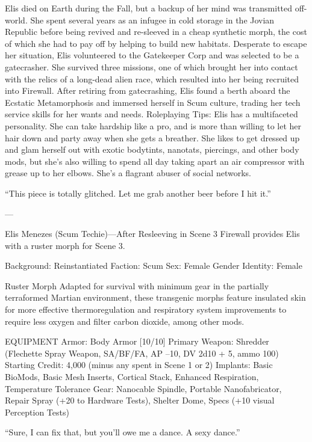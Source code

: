 Elis died on Earth during the Fall, but a backup of her mind was transmitted off-world. She spent several years as an infugee in cold storage in the Jovian Republic before being revived and re-sleeved in a cheap synthetic morph, the cost of which she had to pay off by helping to build new habitats. Desperate to escape her situation, Elis volunteered to the Gatekeeper Corp and was selected to be a gatecrasher. She survived three missions, one of which brought her into contact with the relics of a long-dead alien race, which resulted into her being recruited into Firewall. After retiring from gatecrashing, Elis found a berth aboard the Ecstatic Metamorphosis and immersed herself in Scum culture, trading her tech service skills for her wants and needs.
Roleplaying Tips: Elis has a multifaceted personality. She can take hardship like a pro, and is more than willing to let her hair down and party away when she gets a breather. She likes to get dressed up and glam herself out with exotic bodytints, nanotats, piercings, and other body mods, but she’s also willing to spend all day taking apart an air compressor with grease up to her elbows. She’s a flagrant abuser of social networks. 

“This piece is totally glitched. Let me grab another beer before I hit it.”

---

Elis Menezes (Scum Techie)—After Resleeving in Scene 3
Firewall provides Elis with a ruster morph for Scene 3.

Background: Reinstantiated
Faction: Scum
Sex: Female
Gender Identity: Female

Ruster Morph
Adapted for survival with minimum gear in the partially terraformed Martian environment, these transgenic morphs feature insulated skin for more effective thermoregulation and respiratory system improvements to require less oxygen and filter carbon dioxide, among other mods. 

EQUIPMENT
Armor: Body Armor [10/10]
Primary Weapon: Shredder (Flechette Spray Weapon, SA/BF/FA, AP –10, DV 2d10 + 5, ammo 100)
Starting Credit: 4,000 (minus any spent in Scene 1 or 2) 
Implants: Basic BioMods, Basic Mesh Inserts, Cortical Stack, Enhanced Respiration, Temperature Tolerance
Gear: Nanocable Spindle, Portable Nanofabricator, Repair Spray (+20 to Hardware Tests), Shelter Dome, Specs (+10 visual Perception Tests)

“Sure, I can fix that, but you'll owe me a dance. A sexy dance.”



